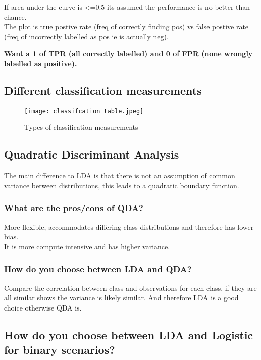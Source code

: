 \documentclass[11pt]{scrartcl} %
\begin{document}
If area under the curve is <=0.5 its assumed the performance is no better than chance.\\

The plot is true postive rate (freq of correctly finding pos) vs false postive rate (freq of incorrectly labelled as pos
 ie is actually neg). 
 
\textbf{Want a 1 of TPR (all correctly labelled) and 0 of FPR (none wrongly labelled as positive).}

\subsection{Different classification measurements}

\begin{figure}[h] %
	\centering
	\texttt{[image: classifcation table.jpeg]} %
	\caption{Types of classification measurements}
\end{figure}

\subsection{Quadratic Discriminant Analysis}

The main difference to LDA is that there is not an assumption of common variance between distributions,
this leads to a quadratic boundary function. 

\subsubsection{What are the pros/cons of QDA?}

More flexible, accommodates differing class distributions and therefore has lower bias.\\

It is more compute intensive and has higher variance.

\subsubsection{How do you choose between LDA and QDA?}

Compare the correlation between class and observations for each class, if they are all similar shows
the variance is likely similar. And therefore LDA is a good choice otherwise QDA is.

\subsection{How do you choose between LDA and Logistic for binary scenarios?}
\end{document}
